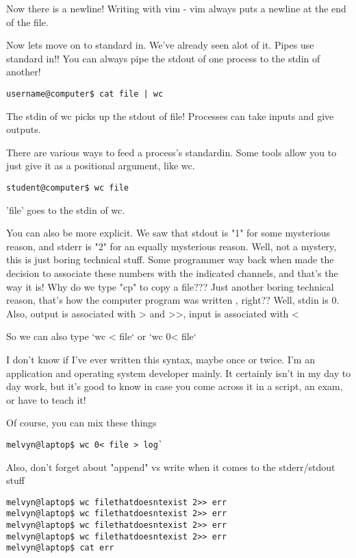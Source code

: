 \documentclass[12pt,a4paper]{article}
\begin{document}
Now there is a newline! Writing with vim - vim always puts a newline at the end of the file.

Now lets move on to standard in. We've already seen alot of it. Pipes use standard in!! You can always pipe the stdout of one process to the stdin of another!

\begin{lstlisting}[style=term]
username@computer$ cat file | wc
\end{lstlisting}

The stdin of wc picks up the stdout of file! Processes can take inputs and give outputs.

There are various ways to feed a process's standardin. Some tools allow you to just give it as a positional argument, like wc.

\begin{lstlisting}[style=term]
student@computer$ wc file
\end{lstlisting}

'file' goes to the stdin of wc.

You can also be more explicit. We saw that stdout is "1" for some mysterious reason, and stderr is "2" for an equally mysterious reason. Well, not a mystery, this is just boring technical stuff. Some programmer way back when made the decision to associate these numbers with the indicated channels, and that's the way it is! Why do we type "cp" to copy a file??? Just another boring technical reason, that's how the computer program was written , right?? Well, stdin is 0. Also, output is associated with > and >>, input is associated with <

So we can also type `wc < file` or `wc 0< file`

I don't know if I've ever written this syntax, maybe once or twice. I'm an application and operating system developer mainly. It certainly isn't in my day to day work, but it's good to know in case you come across it in a script, an exam, or have to teach it!


Of course, you can mix these things

\begin{lstlisting}[style=term]
melvyn@laptop$ wc 0< file > log`
\end{lstlisting}

Also, don't forget about "append" vs write when it comes to the stderr/stdout stuff

\begin{lstlisting}[style=term]
melvyn@laptop$ wc filethatdoesntexist 2>> err
melvyn@laptop$ wc filethatdoesntexist 2>> err
melvyn@laptop$ wc filethatdoesntexist 2>> err
melvyn@laptop$ wc filethatdoesntexist 2>> err
melvyn@laptop$ cat err
\end{lstlisting}
\end{document}

